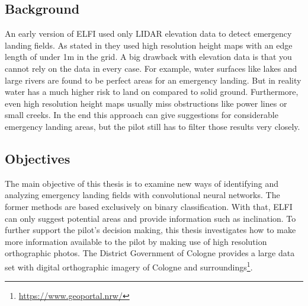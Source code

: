 \subsection{Background}
An early version of ELFI used only LIDAR elevation data to detect emergency landing fields. As stated in \cite{feu_elfi} they used high resolution height maps with an edge length of under 1m in the grid. A big drawback with elevation data is that you cannot rely on the data in every case. For example, water surfaces like lakes and large rivers are found to be perfect areas for an emergency landing. But in reality water has a much higher risk to land on compared to solid ground. Furthermore, even high resolution height maps usually miss obstructions like power lines or small creeks. In the end this approach can give suggestions for considerable emergency landing areas, but the pilot still has to filter those results very closely.



\subsection{Objectives}
The main objective of this thesis is to examine new ways of identifying and analyzing emergency landing fields with convolutional neural networks. The former methods are based exclusively on binary classification. With that, ELFI can only suggest potential areas and provide information such as inclination. To further support the pilot's decision making, this thesis investigates how to make more information available to the pilot by making use of high resolution orthographic photos. The District Government of Cologne provides a large data set with digital orthographic imagery of Cologne and surroundings\footnote{\url{https://www.geoportal.nrw/}}.

